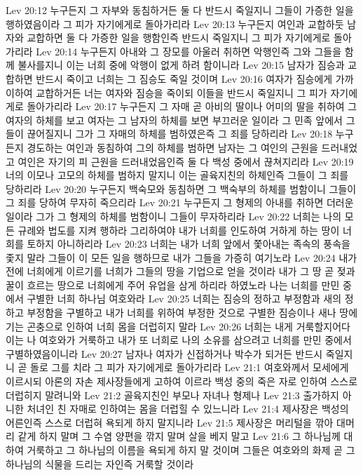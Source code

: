 Lev 20:12  누구든지 그 자부와 동침하거든 둘 다 반드시 죽일지니 그들이 가증한 일을 행하였음이라 그 피가 자기에게로 돌아가리라
Lev 20:13  누구든지 여인과 교합하둣 남자와 교합하면 둘 다 가증한 일을 행함인즉 반드시 죽일지니 그 피가 자기에게로 돌아가리라
Lev 20:14  누구든지 아내와 그 장모를 아울러 취하면 악행인즉 그와 그들을 함께 불사를지니 이는 너희 중에 악행이 없게 하려 함이니라
Lev 20:15  남자가 짐승과 교합하면 반드시 죽이고 너희는 그 짐승도 죽일 것이며
Lev 20:16  여자가 짐승에게 가까이하여 교합하거든 너는 여자와 짐승을 죽이되 이들을 반드시 죽일지니 그 피가 자기에게로 돌아가리라
Lev 20:17  누구든지 그 자매 곧 아비의 딸이나 어미의 딸을 취하여 그 여자의 하체를 보고 여자는 그 남자의 하체를 보면 부끄러운 일이라 그 민족 앞에서 그들이 끊어질지니 그가 그 자매의 하체를 범하였은즉 그 죄를 당하리라
Lev 20:18  누구든지 경도하는 여인과 동침하여 그의 하체를 범하면 남자는 그 여인의 근원을 드러내었고 여인은 자기의 피 근원을 드러내었음인즉 둘 다 백성 중에서 끊쳐지리라
Lev 20:19  너의 이모나 고모의 하체를 범하지 말지니 이는 골육지친의 하체인즉 그들이 그 죄를 당하리라
Lev 20:20  누구든지 백숙모와 동침하면 그 백숙부의 하체를 범함이니 그들이 그 죄를 당하여 무자히 죽으리라
Lev 20:21  누구든지 그 형제의 아내를 취하면 더러운 일이라 그가 그 형제의 하체를 범함이니 그들이 무자하리라
Lev 20:22  너희는 나의 모든 규례와 법도를 지켜 행하라 그리하여야 내가 너희를 인도하여 거하게 하는 땅이 너희를 토하지 아니하리라
Lev 20:23  너희는 내가 너희 앞에서 쫓아내는 족속의 풍속을 좇지 말라 그들이 이 모든 일을 행하므로 내가 그들을 가증히 여기노라
Lev 20:24  내가 전에 너희에게 이르기를 너희가 그들의 땅을 기업으로 얻을 것이라 내가 그 땅 곧 젖과 꿀이 흐르는 땅으로 너희에게 주어 유업을 삼게 하리라 하였노라 나는 너희를 만민 중에서 구별한 너희 하나님 여호와라
Lev 20:25  너희는 짐승의 정하고 부정함과 새의 정하고 부정함을 구별하고 내가 너희를 위하여 부정한 것으로 구별한 짐승이나 새나 땅에 기는 곤충으로 인하여 너희 몸을 더럽히지 말라
Lev 20:26  너희는 내게 거룩할지어다 이는 나 여호와가 거룩하고 내가 또 너희로 나의 소유를 삼으려고 너희를 만민 중에서 구별하였음이니라
Lev 20:27  남자나 여자가 신접하거나 박수가 되거든 반드시 죽일지니 곧 돌로 그를 치라 그 피가 자기에게로 돌아가리라
Lev 21:1  여호와께서 모세에게 이르시되 아론의 자손 제사장들에게 고하여 이르라 백성 중의 죽은 자로 인하여 스스로 더럽히지 말려니와
Lev 21:2  골육지친인 부모나 자녀나 형제나
Lev 21:3  출가하지 아니한 처녀인 친 자매로 인하여는 몸을 더럽힐 수 있느니라
Lev 21:4  제사장은 백성의 어른인즉 스스로 더럽혀 욕되게 하지 말지니라
Lev 21:5  제사장은 머리털을 깎아 대머리 같게 하지 말며 그 수염 양편을 깎지 말며 살을 베지 말고
Lev 21:6  그 하나님께 대하여 거룩하고 그 하나님의 이름을 욕되게 하지 말 것이며 그들은 여호와의 화제 곧 그 하나님의 식물을 드리는 자인즉 거룩할 것이라
